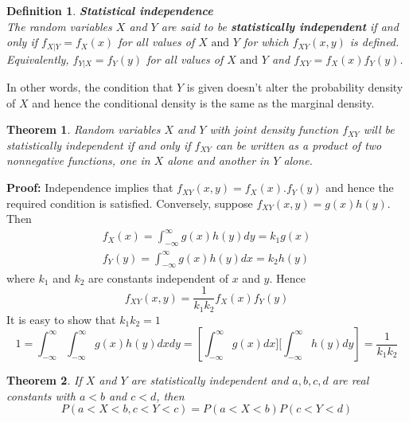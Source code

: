 \documentclass{article}
\newtheorem{definition}{Definition}[section]
\newtheorem{theorem}{Theorem}[section]
\begin{document}
\begin{definition} \textbf{Statistical independence} \\
    The random variables \(X\) and \(Y\) are said to be \textbf{statistically independent} if and only if \(f_{X|Y}=f_X(x)\) for all values of \(X \text{ and } Y\) for which \(f_{XY}(x,y)\) is defined. Equivalently, \(f_{Y|X}=f_Y(y)\) for all values of \(X \text{ and } Y\) and \(f_{XY}=f_X(x)f_Y(y)\). 
\end{definition}

In other words, the condition that \(Y\) is given doesn't alter the probability density of \(X\) and hence the conditional density is the same as the marginal density.

\begin{theorem}
    Random variables \(X\) and \(Y\) with joint density function \(f_{XY}\) will be statistically independent if and only if \(f_{XY}\) can be written as a product of two nonnegative functions, one in \(X\) alone and another in \(Y\) alone.
\end{theorem}

\textbf{Proof:} Independence implies that \(f_{XY}(x,y)=f_X(x).f_Y(y)\) and hence the required condition is satisfied. Conversely, suppose \(f_{XY}(x,y)=g(x)h(y)\). Then
\begin{equation*}
    \begin{split}
    f_X(x)=\int_{-\infty}^{\infty} g(x) h(y) dy = k_1 g(x) \\
    f_Y(y)=\int_{-\infty}^{\infty} g(x) h(y) dx = k_2 h(y)
    \end{split}
\end{equation*}
where \(k_1\) and \(k_2\) are constants independent of \(x\) and \(y\). Hence
\begin{equation*}
   f_{XY}(x,y)=\frac{1}{k_1k_2} f_X(x)f_Y(y) 
\end{equation*}
It is easy to show that \(k_1k_2=1\)
\begin{equation*}
    1=\int_{-\infty}^{\infty} \int_{-\infty}^{\infty} g(x) h(y) dxdy = \left[\int_{-\infty}^{\infty} g(x) dx] [\int_{-\infty}^{\infty} h(y) dy\right] = \frac{1}{k_1k_2}
\end{equation*}

\begin{theorem}
    If \(X\) and \(Y\) are statistically independent and \(a,b,c,d\) are real constants with \(a<b\) and \(c<d\), then
    \begin{equation*}
        P(a<X<b, c<Y<c) = P(a<X<b) P(c<Y<d)
    \end{equation*}
\end{theorem}
\end{document}
